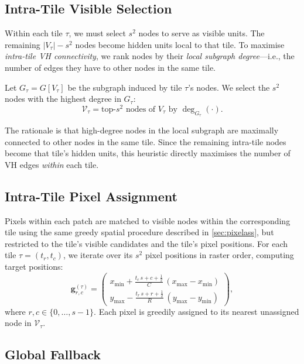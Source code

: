 \documentclass[11pt,a4paper]{article}
\newcommand{\VV}{\mathcal{V}}
\begin{document}
\subsection{Intra-Tile Visible Selection}\label{sec:intratile}

Within each tile $\tau$, we must select $s^2$ nodes to serve as visible units.  The remaining $|V_\tau| - s^2$ nodes become hidden units local to that tile.  To maximise \emph{intra-tile VH connectivity}, we rank nodes by their \emph{local subgraph degree}---i.e., the number of edges they have to other nodes in the same tile.

Let $G_\tau = G[V_\tau]$ be the subgraph induced by tile $\tau$'s nodes.  We select the $s^2$ nodes with the highest degree in $G_\tau$:
\begin{equation}\label{eq:visselect}
  \VV_\tau = \text{top-}s^2 \text{ nodes of } V_\tau \text{ by } \deg_{G_\tau}(\cdot).
\end{equation}

The rationale is that high-degree nodes in the local subgraph are maximally connected to other nodes in the same tile.  Since the remaining intra-tile nodes become that tile's hidden units, this heuristic directly maximises the number of VH edges \emph{within} each tile.

\subsection{Intra-Tile Pixel Assignment}

Pixels within each patch are matched to visible nodes within the corresponding tile using the same greedy spatial procedure described in \cref{sec:pixelass}, but restricted to the tile's visible candidates and the tile's pixel positions.  For each tile $\tau = (t_r, t_c)$, we iterate over its $s^2$ pixel positions in raster order, computing target positions:
\[
  \mathbf{g}^{(\tau)}_{r,c} = 
  \begin{pmatrix}
    x_{\min} + \frac{t_c\,s + c + \tfrac{1}{2}}{C}\,(x_{\max}-x_{\min}) \\[4pt]
    y_{\max} - \frac{t_r\,s + r + \tfrac{1}{2}}{R}\,(y_{\max}-y_{\min})
  \end{pmatrix},
\]
where $r,c\in\{0,\ldots,s{-}1\}$.  Each pixel is greedily assigned to its nearest unassigned node in $\VV_\tau$.

\subsection{Global Fallback}
\end{document}
